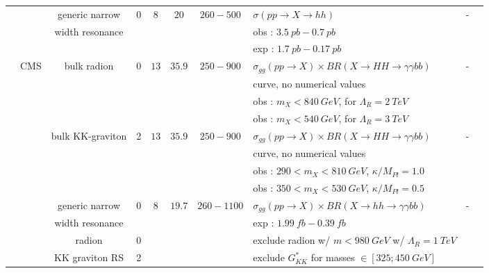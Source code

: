 \begin{table}[h!]
{\begin{tabular}{|l|l|c|c|c|c|c|l|c|c|}
\cline{3-10}
                    &        &generic narrow            &0    &$8$        &$20$        &$260-500$        &$\sigma(pp\rightarrow X\rightarrow hh)$     &-    &\cite{Aad:2014yja}\\
                    &        &width resonance        &    &        &        &            &obs : $3.5\ pb-0.7\ pb$                &    &\\
                    &        &                &    &        &        &            &exp : $1.7\ pb-0.17\ pb$                &    &\\
\cline{2-10}
                    &CMS        &bulk radion             &0    &$13$        &$35.9$        &$250-900$        &$\sigma_{gg}(pp\rightarrow X)\times BR(X\rightarrow HH\rightarrow \gamma\gamma bb)$     &-    &\cite{Sirunyan:2018iwt}\\
                    &        &                &    &        &        &            &curve, no numerical values        &    &\\
                    &        &                &    &        &        &            &obs : $m_X<840\ GeV$, for $\Lambda_R=2\ TeV$    &    &\\
                    &        &                &    &        &        &            &obs : $m_X<540\ GeV$, for $\Lambda_R=3\ TeV$     &    &\\
\cline{3-10}
                    &        &bulk KK-graviton         &2    &$13$        &$35.9$        &$250-900$        &$\sigma_{gg}(pp\rightarrow X)\times BR(X\rightarrow HH\rightarrow \gamma\gamma bb)$     &-    &\cite{Sirunyan:2018iwt}\\
                    &        &                &    &        &        &            &curve, no numerical values                                &    &\\
                    &        &                &    &        &        &            &obs : $290<m_X<810\ GeV$, $\kappa/M_{Pl}=1.0$                        &    &\\
                    &        &                 &    &        &        &            &obs : $350<m_X<530\ GeV$, $\kappa/M_{Pl}=0.5$                         &    &\\

\cline{3-10}
                    &        &generic narrow            &0    &$8$        &$19.7$        &$260-1100$        &$\sigma_{gg}(pp\rightarrow X)\times BR(X\rightarrow hh\rightarrow \gamma\gamma bb)$     &-    &\cite{Khachatryan:2016sey}\\
                    &        &width resonance        &    &        &        &            &exp : $1.99\ fb-0.39\ fb$                                &    &\\
                    &        &radion                &0    &        &        &            &exclude radion w/ $m<980\ GeV$ w/ $\Lambda_R=1\ TeV$                    &    &\\
                    &        &KK graviton RS            &2    &        &        &            &exclude $G_{KK}^{*}$ for masses $\in [325 ; 450\ GeV]$                    &    &\\


\end{tabular}}
\end{table}
